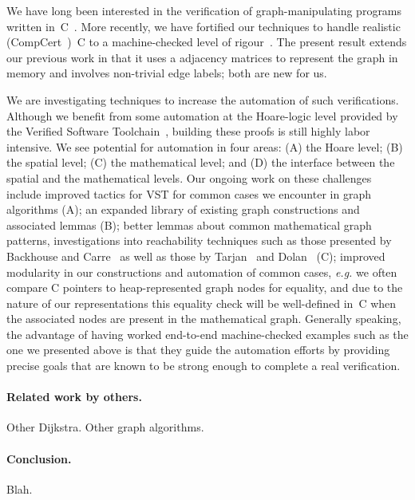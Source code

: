 We have long been interested in
the verification of graph-manipulating programs written in~C~\cite{ramify}.
More recently, we have fortified our techniques to handle realistic (CompCert~\cite{CompCert})~C
to a machine-checked level of rigour~\cite{localize}.  The present result extends
our previous work in that it uses a adjacency matrices to represent the graph in
memory and involves non-trivial edge labels; both are new for us.

We are investigating techniques to increase the automation of such verifications.  Although
we benefit from some automation at the Hoare-logic level provided by the Verified Software
Toolchain~\cite{VST}, building these proofs is still highly labor intensive.  We see potential
for automation in four areas: (A) the Hoare level; (B) the spatial level; (C) the mathematical level; and (D) the interface between the spatial and the mathematical levels.  Our ongoing work
on these challenges include improved tactics for VST for common cases we encounter in graph
algorithms (A); an expanded library of existing graph constructions and associated lemmas (B);
better lemmas about common mathematical graph patterns, investigations into reachability techniques
such as those presented by Backhouse and Carre~\cite{backhouse} as well as those by Tarjan~\cite{tarjan} and Dolan~\cite{dolan} (C); improved modularity in our constructions and
automation of common cases, \emph{e.g.} we often compare C pointers to heap-represented graph
nodes for equality, and due to the nature of our representations this equality check will be
well-defined in~C when the associated nodes are present in the mathematical graph.  Generally
speaking, the advantage of having worked end-to-end machine-checked examples such as
the one we presented above is that they guide the automation efforts by providing precise goals
that are known to be strong enough to complete a real verification.

\paragraph{Related work by others.}
Other Dijkstra.  Other graph algorithms.

\paragraph{Conclusion.}
Blah.
